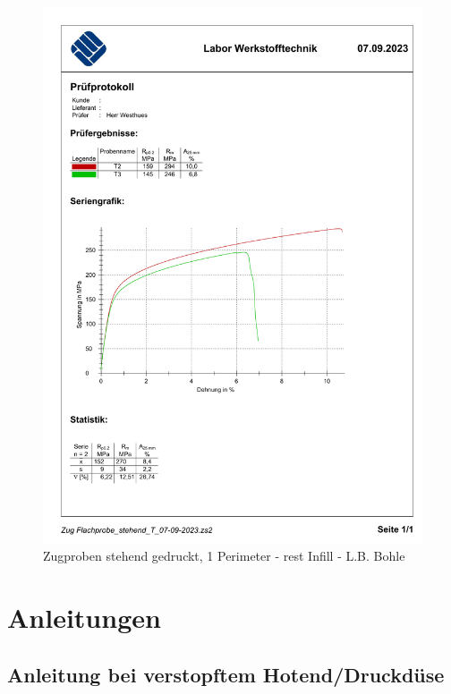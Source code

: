   \begin{figure}[ht]
    \centering
    \includegraphics[width=1\textwidth]{bilder/Zug Flachprobe_stehend_T.pdf}
    \caption{Zugproben stehend gedruckt, 1 Perimeter - rest Infill - L.B. Bohle}
    \label{ZugprobenT}
  \end{figure}
  
  

\section{Anleitungen}
\subsection*{Anleitung bei verstopftem Hotend/Druckdüse}

